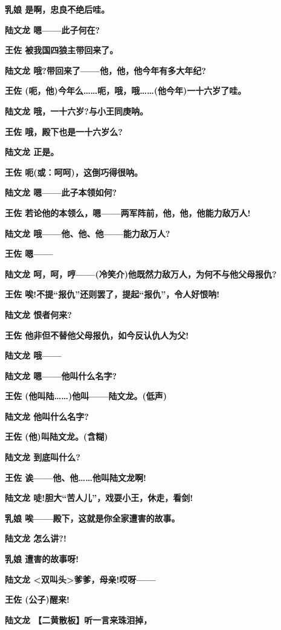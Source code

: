 \textbf{乳娘 是啊，忠良不绝后哇。}

\textbf{陆文龙 嗯------此子何在?}

\textbf{王佐 被我国四狼主带回来了。}

\textbf{陆文龙 哦?带回来了------他，他，他今年有多大年纪?}

\textbf{王佐
(呃，他)今年么\ldots{}\ldots{}呃，哦，哦\ldots{}\ldots{}(他今年)一十六岁了哇。}

\textbf{陆文龙 哦，一十六岁?与小王同庚呐。}

\textbf{王佐 哦，殿下也是一十六岁么?}

\textbf{陆文龙 正是。}

\textbf{王佐 呃(或：呵呵)，这倒巧得很呐。}

\textbf{陆文龙 嗯------此子本领如何?}

\textbf{王佐 若论他的本领么，嗯------两军阵前，他，他，他能力敌万人!}

\textbf{陆文龙 哦------他、他、他------能力敌万人?}

\textbf{王佐 嗯------}

\textbf{陆文龙
呵，呵，哼------(冷笑介)他既然力敌万人，为何不与他父母报仇?}

\textbf{王佐 唉!不提``报仇''还则罢了，提起``报仇''，令人好恨呐!}

\textbf{陆文龙 恨者何来?}

\textbf{王佐 他非但不替他父母报仇，如今反认仇人为父!}

\textbf{陆文龙 哦------}

\textbf{陆文龙 嗯------他叫什么名字?}

\textbf{王佐 (他叫陆\ldots{}\ldots{})他叫------陆文龙。(低声)}

\textbf{陆文龙 他叫什么名字?}

\textbf{王佐 (他)叫陆文龙。(含糊)}

\textbf{陆文龙 到底叫什么?}

\textbf{王佐 诶------他、他\ldots{}\ldots{}他叫陆文龙啊!}

\textbf{陆文龙 唗!胆大``苦人儿''，戏耍小王，休走，看剑!}

\textbf{乳娘 唉------殿下，这就是你全家遭害的故事。}

\textbf{陆文龙 怎么讲?!}

\textbf{乳娘 遭害的故事呀!}

\textbf{陆文龙 \textless{}双叫头\textgreater{}爹爹，母亲!哎呀------}

\textbf{王佐 (公子)醒来!}

\textbf{陆文龙 【二黄散板】听一言来珠泪掉，}


